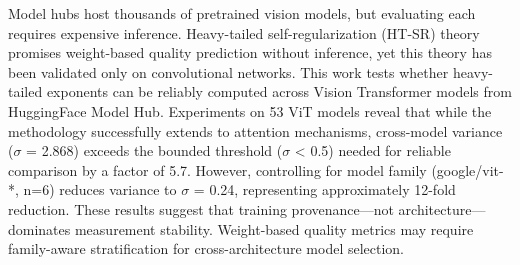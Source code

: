 
Model hubs host thousands of pretrained vision models, but evaluating each requires expensive inference. Heavy-tailed self-regularization (HT-SR) theory promises weight-based quality prediction without inference, yet this theory has been validated only on convolutional networks. This work tests whether heavy-tailed exponents can be reliably computed across Vision Transformer models from HuggingFace Model Hub. Experiments on 53 ViT models reveal that while the methodology successfully extends to attention mechanisms, cross-model variance ($\sigma$ = 2.868) exceeds the bounded threshold ($\sigma$ < 0.5) needed for reliable comparison by a factor of 5.7. However, controlling for model family (google/vit-*, n=6) reduces variance to $\sigma$ = 0.24, representing approximately 12-fold reduction. These results suggest that training provenance---not architecture---dominates measurement stability. Weight-based quality metrics may require family-aware stratification for cross-architecture model selection.

